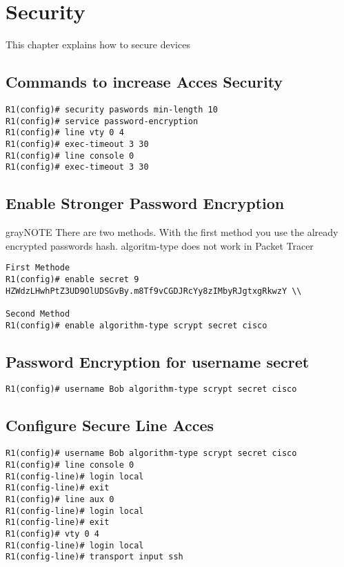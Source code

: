 \section{Security}
This chapter explains how to secure devices
\subsection{Commands to increase Acces Security}
\begin{verbatim}
R1(config)# security paswords min-length 10
R1(config)# service password-encryption
R1(config)# line vty 0 4
R1(config)# exec-timeout 3 30
R1(config)# line console 0
R1(config)# exec-timeout 3 30
\end{verbatim}

\subsection{Enable Stronger Password Encryption}
\begin{textbox}{gray}{NOTE}
There are two methods. With the first method you use the already encrypted passwords hash. algoritm-type does not work in Packet Tracer
\end{textbox}
\begin{verbatim}
First Methode
R1(config)# enable secret 9 HZWdzLHwhPtZ3UD9OlUDSGvBy.m8Tf9vCGDJRcYy8zIMbyRJgtxgRkwzY \\

Second Method
R1(config)# enable algorithm-type scrypt secret cisco
\end{verbatim}

\subsection{Password Encryption for username secret}
\begin{verbatim}
R1(config)# username Bob algorithm-type scrypt secret cisco
\end{verbatim}

\subsection{Configure Secure Line Acces}
\begin{verbatim}
R1(config)# username Bob algorithm-type scrypt secret cisco
R1(config)# line console 0
R1(config-line)# login local
R1(config-line)# exit
R1(config)# line aux 0
R1(config-line)# login local
R1(config-line)# exit
R1(config)# vty 0 4
R1(config-line)# login local
R1(config-line)# transport input ssh
\end{verbatim}


